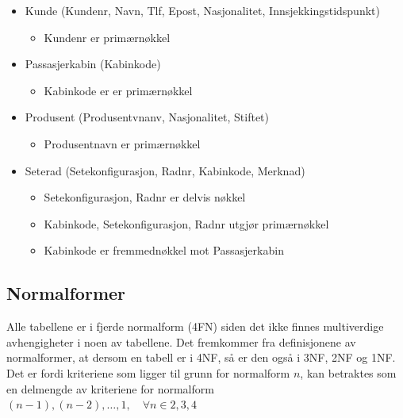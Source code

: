 \documentclass[a4paper,12pt]{article}
\begin{document}
\begin{itemize}
\item Kunde (Kundenr, Navn, Tlf, Epost, Nasjonalitet, Innsjekkingstidspunkt)
\begin{itemize}
\item Kundenr er primærnøkkel
\end{itemize}

\item Passasjerkabin (Kabinkode)
\begin{itemize}
\item Kabinkode er er primærnøkkel
\end{itemize}

\item Produsent (Produsentvnanv, Nasjonalitet, Stiftet)
\begin{itemize}
\item Produsentnavn er primærnøkkel
\end{itemize}

\item Seterad (Setekonfigurasjon, Radnr, Kabinkode, Merknad)
\begin{itemize}
\item Setekonfigurasjon, Radnr er delvis nøkkel
\item Kabinkode, Setekonfigurasjon, Radnr utgjør primærnøkkel
\item Kabinkode er fremmednøkkel mot Passasjerkabin 
\end{itemize}

\end{itemize}

\subsection{Normalformer}
Alle tabellene er i fjerde normalform (4FN) siden det ikke finnes
multiverdige avhengigheter i noen av tabellene. Det fremkommer fra definisjonene
av normalformer, at dersom en tabell er i 4NF, så er den også i 3NF, 2NF og 1NF.
Det er fordi kriteriene som ligger til grunn for normalform $n$, kan betraktes
som en delmengde av kriteriene for normalform $(n-1), (n-2), \ldots, 1, \quad \forall
n \in {2,3,4}$
\end{document}
